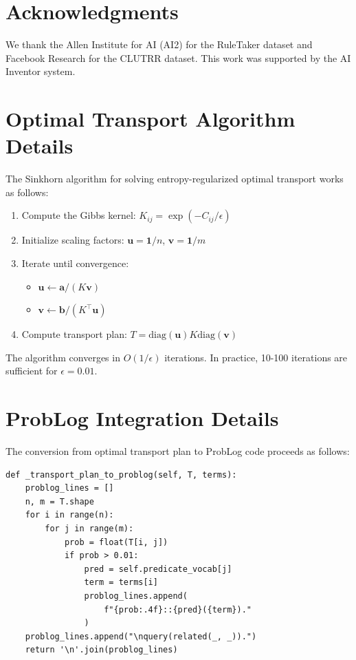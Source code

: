\documentclass[11pt,letterpaper]{article}
\begin{document}
\section*{Acknowledgments}

We thank the Allen Institute for AI (AI2) for the RuleTaker dataset and Facebook Research for the CLUTRR dataset. This work was supported by the AI Inventor system.




\appendix

\section{Optimal Transport Algorithm Details}

The Sinkhorn algorithm for solving entropy-regularized optimal transport works as follows:

\begin{enumerate}
\item Compute the Gibbs kernel: $K_{ij} = \exp(-C_{ij}/\epsilon)$
\item Initialize scaling factors: $\mathbf{u} = \mathbf{1}/n$, $\mathbf{v} = \mathbf{1}/m$
\item Iterate until convergence:
   \begin{itemize}[noitemsep]
   \item $\mathbf{u} \leftarrow \mathbf{a} / (K \mathbf{v})$
   \item $\mathbf{v} \leftarrow \mathbf{b} / (K^\top \mathbf{u})$
   \end{itemize}
\item Compute transport plan: $T = \text{diag}(\mathbf{u}) K \text{diag}(\mathbf{v})$
\end{enumerate}

The algorithm converges in $O(1/\epsilon)$ iterations. In practice, 10-100 iterations are sufficient for $\epsilon = 0.01$.

\section{ProbLog Integration Details}

The conversion from optimal transport plan to ProbLog code proceeds as follows:

\begin{lstlisting}[basicstyle=\ttfamily\small, frame=single]
def _transport_plan_to_problog(self, T, terms):
    problog_lines = []
    n, m = T.shape
    for i in range(n):
        for j in range(m):
            prob = float(T[i, j])
            if prob > 0.01:
                pred = self.predicate_vocab[j]
                term = terms[i]
                problog_lines.append(
                    f"{prob:.4f}::{pred}({term})."
                )
    problog_lines.append("\nquery(related(_, _)).")
    return '\n'.join(problog_lines)
\end{lstlisting}
\end{document}
